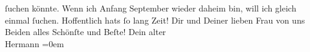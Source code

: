 \begin{ledgroupsized}[t]{13cm}
               ſuchen könnte. Wenn ich Anfang September wieder daheim bin, will ich gleich einmal
               ſuchen. Hoffentlich hats ſo lang Zeit!\pend
           \pstart
           Dir und Deiner lieben Frau von
                  uns Beiden alles Schönſte
               und Beſte!\pend
           \pstart
           Dein alter{\\[\baselineskip]}\spacefill\mbox{Hermann}\pend
           \leftskip=0em{}
         
         \endnumbering{}\end{ledgroupsized}  \newcommand{\dateiname}{L02183}\newcommand{\titel}{Hermann Bahr an Arthur Schnitzler, 14. 6. 1914}\newcommand{\editorInnen}{ Kurt Ifkovits,  Martin Anton Müller}
      